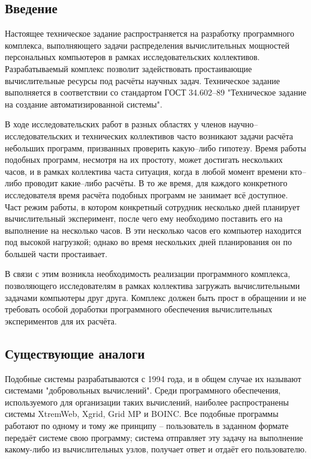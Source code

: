 \documentclass[a4paper,12pt]{report}
\numberwithin{equation}{section}
\begin{document}
\subsection{Введение}

Настоящее техническое задание распространяется на разработку программного комплекса, выполняющего задачи распределения вычислительных мощностей персональных компьютеров в рамках исследовательских коллективов. Разрабатываемый комплекс позволит задействовать простаивающие вычислительные ресурсы под расчёты научных задач. Техническое задание выполняется в соответствии со стандартом ГОСТ 34.602--89 "Техническое задание на создание автоматизированной системы".

В ходе исследовательских работ в разных областях у членов научно--исследовательских и технических коллективов часто возникают задачи расчёта небольших программ, призванных проверить какую--либо гипотезу. 
Время работы подобных программ, несмотря на их простоту, может достигать нескольких часов, и в рамках коллектива часта ситуация, когда в любой момент времени кто--либо проводит какие--либо расчёты. 
В то же время, для каждого конкретного исследователя время расчёта подобных программ не занимает всё доступное. 
Част режим работы, в котором конкретный сотрудник несколько дней планирует вычислительный эксперимент, после чего ему необходимо поставить его на выполнение на несколько часов. 
В эти несколько часов его компьютер находится под высокой нагрузкой; однако во время нескольких дней планирования он по большей части простаивает.

В связи с этим возникла необходимость реализации программного комплекса, позволяющего исследователям в рамках коллектива загружать вычислительными задачами компьютеры друг друга.
Комплекс должен быть прост в обращении и не требовать особой доработки программного обеспечения вычислительных экспериментов для их расчёта.

\clearpage
\subsection{Существующие аналоги}

Подобные системы разрабатываются с 1994 года, и в общем случае их называют системами "добровольных вычислений".
Среди программного обеспечения, используемого для организации таких вычислений, наиболее распространены системы XtremWeb, Xgrid, Grid MP и BOINC.
Все подобные программы работают по одному и тому же принципу -- пользователь в заданном формате передаёт системе свою программу; система отправляет эту задачу на выполнение какому-либо из вычислительных узлов, получает ответ и отдаёт его пользователю.
\end{document}
